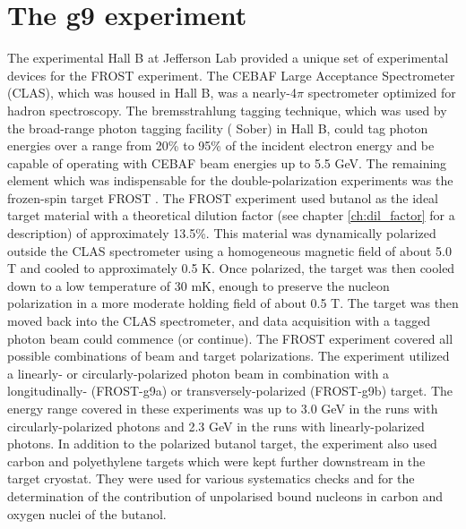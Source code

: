 \section{The g9 experiment}
The experimental Hall B at Jefferson Lab provided a unique set of experimental devices for the FROST experiment. The CEBAF Large Acceptance Spectrometer (CLAS)\cite{CLAS}, which was housed in Hall B, was a nearly-4$\pi$ spectrometer optimized for hadron spectroscopy. The bremsstrahlung tagging technique, which was used by the broad-range photon tagging facility ( Sober\cite{Sober_2000}) in Hall B, could tag photon energies over a range from 20\% to 95\% of the incident electron energy and be capable of operating with CEBAF beam energies up to 5.5 GeV. The remaining element which was indispensable for the double-polarization experiments was the frozen-spin target FROST \cite{Keith_2012}. The FROST experiment used butanol as the ideal target material with a theoretical dilution factor (see chapter \ref{ch:dil_factor} for a description) of approximately 13.5\%. This material was dynamically polarized outside the CLAS spectrometer using a homogeneous magnetic field of about 5.0 T and cooled to approximately 0.5 K. Once polarized, the target was then cooled down to a low temperature of 30 mK, enough to preserve the nucleon polarization in a more moderate holding field of about 0.5 T. The target was then moved back into the CLAS spectrometer, and data acquisition with a tagged photon beam could commence (or continue). The FROST experiment covered all possible combinations of beam and target polarizations. The experiment utilized a linearly- or circularly-polarized photon beam in combination with a longitudinally- (FROST-g9a) or transversely-polarized (FROST-g9b) target. The energy range covered in these experiments was up to 3.0 GeV in the runs with circularly-polarized photons and 2.3 GeV in the runs with linearly-polarized photons. In addition to the polarized butanol target, the experiment also used carbon and polyethylene targets which were kept further downstream in the target cryostat. They were used for various systematics checks and for the determination of the contribution of unpolarised bound nucleons in carbon and oxygen nuclei of the butanol.
